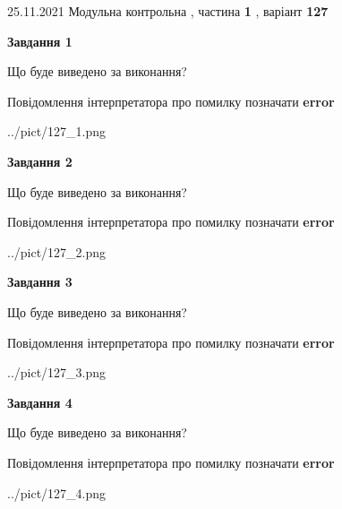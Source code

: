 \documentclass[10pt, ukrainian]{article}
\begin{document}
{25.11.2021 Модульна контрольна , частина \textbf { 1 }, варіант  \No \textbf { 127 }\par}
{
\begin {large}

{\begin {center}\textbf{Завдання 1}\end {center}}\par
Що буде виведено за виконання? \par
Повідомлення інтерпретатора про помилку позначати \textbf{error}

\begin{center}
	{../pict/127_1.png}
\end{center}
\newpage

{\begin {center}\textbf{Завдання 2}\end {center}}\par
Що буде виведено за виконання? \par
Повідомлення інтерпретатора про помилку позначати \textbf{error}

\begin{center}
	{../pict/127_2.png}
\end{center}
\newpage

{\begin {center}\textbf{Завдання 3}\end {center}}\par
Що буде виведено за виконання? \par
Повідомлення інтерпретатора про помилку позначати \textbf{error}

\begin{center}
	{../pict/127_3.png}
\end{center}
\newpage

{\begin {center}\textbf{Завдання 4}\end {center}}\par
Що буде виведено за виконання? \par
Повідомлення інтерпретатора про помилку позначати \textbf{error}

\begin{center}
	{../pict/127_4.png}
\end{center}
\newpage


\end{large}}
\end{document}
